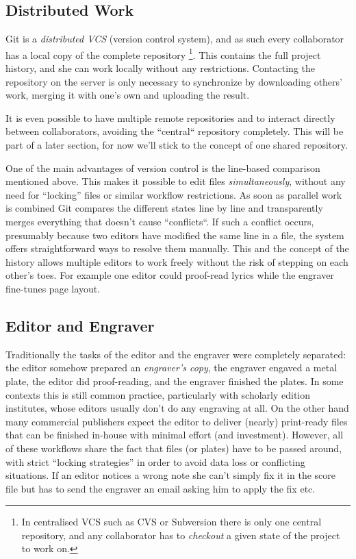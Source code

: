 \documentclass[11pt,a4paper]{article}
\begin{document}
\subsection{Distributed Work}
Git is a \textsl{distributed VCS} (version control system), and as such every collaborator
has a local copy of the complete repository%
\footnote{In centralised VCS such as CVS or Subversion there is only one central repository,
and any collaborator has to \emph{checkout} a given state of the project to work on.}.
This contains the full project history, and she can work locally without any restrictions.
Contacting the repository on the server is only necessary to synchronize by downloading
others' work, merging it with one's own and uploading the result.

It is even possible to have multiple remote repositories and to interact directly
between collaborators, avoiding the “central“ repository completely. This will be part
of a later section, for now we'll stick to the concept of one shared repository.

One of the main advantages of version control is the line-based comparison mentioned above.
This makes it possible to edit files \emph{simultaneously}, without any need for “locking”
files or similar workflow restrictions. As soon as parallel work is combined Git compares
the different states line by line and transparently merges everything that doesn't cause
“conflicts“. If such a conflict occurs, presumably because two editors have modified the
same line in a file, the system offers straightforward ways to resolve them manually.
This and the concept of the history allows multiple editors to work freely without the risk
of stepping on each other's toes. For example one editor could proof-read lyrics while
the engraver fine-tunes page layout.

\subsection{Editor and Engraver}
Traditionally the tasks of the editor and the engraver were completely separated: the
editor somehow prepared an \emph{engraver's copy}, the engraver engaved a metal plate,
the editor did proof-reading, and the engraver finished the plates. In some contexts
this is still common practice, particularly with scholarly edition institutes, whose
editors usually don't do any engraving at all. On the other hand many commercial
publishers expect the editor to deliver (nearly) print-ready files that can be
finished in-house with minimal effort (and investment). However, all of these workflows
share the fact that files (or plates) have to be passed around, with strict
“locking strategies” in order to avoid data loss or conflicting situations. If an editor
notices a wrong note she can't simply fix it in the score file but has to send the
engraver an email asking him to apply the fix etc.
\end{document}

